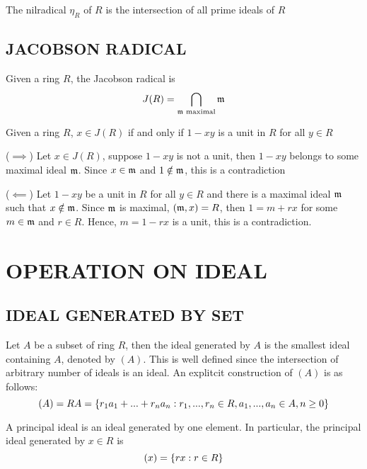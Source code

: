 \begin{corollary}
	The nilradical $\eta_R$ of $R$ is the intersection of all prime ideals of $R$
\end{corollary}

\subsection{JACOBSON RADICAL}

\begin{definition}
	Given a ring $R$, the Jacobson radical is
	$$
		J(R) = \bigcap_{\mathfrak{m} \text{ maximal}} \mathfrak{m}
	$$
\end{definition}

\begin{proposition}
	Given a ring $R$, $x \in J(R)$ if and only if $1 - xy$ is a unit in $R$ for all $y \in R$
\end{proposition}

\begin{longproof}
	($\implies$) Let $x \in J(R)$, suppose $1 - xy$ is not a unit, then $1 - xy$ belongs to some maximal ideal $\mathfrak{m}$. Since $x \in \mathfrak{m}$ and $1 \notin \mathfrak{m}$, this is a contradiction
	
	($\impliedby$) Let $1 - xy$ be a unit in $R$ for all $y \in R$ and there is a maximal ideal $\mathfrak{m}$ such that $x \notin \mathfrak{m}$. Since $\mathfrak{m}$ is maximal, $(\mathfrak{m}, x) = R$, then $1 = m + rx$ for some $m \in \mathfrak{m}$ and $r \in R$. Hence, $m = 1 - rx$ is a unit, this is a contradiction.
\end{longproof}

\section{OPERATION ON IDEAL}

\subsection{IDEAL GENERATED BY SET}
\begin{definition}
	Let $A$ be a subset of ring $R$, then the ideal generated by $A$ is the smallest ideal containing $A$, denoted by $(A)$. This is well defined since the intersection of arbitrary number of ideals is an ideal. An explitcit construction of $(A)$ is as follows:
	$$
		(A) = RA = \{r_1 a_1 + ... + r_n a_n: r_1, ..., r_n \in R, a_1, ..., a_n \in A, n \geq 0\}
	$$
	
	A principal ideal is an ideal generated by one element. In particular, the principal ideal generated by $x \in R$ is
	$$
		(x) = \{rx: r \in R\}
	$$
\end{definition}


